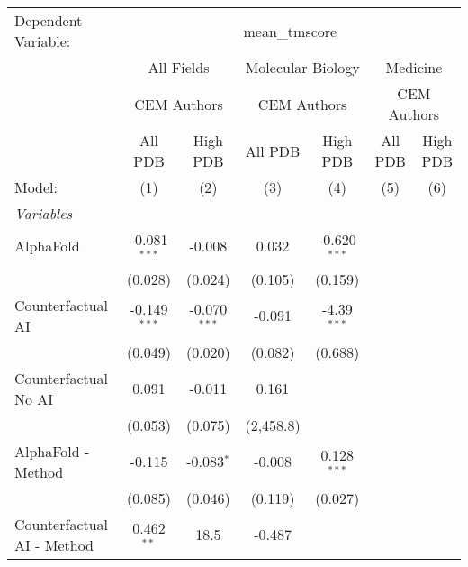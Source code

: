 \begingroup
\centering
\begin{tabular}{lcccccc}
   \tabularnewline \midrule \midrule
   Dependent Variable: & \multicolumn{6}{c}{mean\_tmscore}\\
 & \multicolumn{2}{c}{All Fields} & \multicolumn{2}{c}{Molecular Biology} & \multicolumn{2}{c}{Medicine} \\
\cmidrule(lr){2-3} \cmidrule(lr){4-5} \cmidrule(lr){6-7}
 & \multicolumn{2}{c}{CEM Authors} & \multicolumn{2}{c}{CEM Authors} & \multicolumn{2}{c}{CEM Authors} \\
\cmidrule(lr){2-3} \cmidrule(lr){4-5} \cmidrule(lr){6-7}
 & \multicolumn{1}{c}{All PDB} & \multicolumn{1}{c}{High PDB} & \multicolumn{1}{c}{All PDB} & \multicolumn{1}{c}{High PDB} & \multicolumn{1}{c}{All PDB} & \multicolumn{1}{c}{High PDB} \\
\cmidrule(lr){2-2} \cmidrule(lr){3-3} \cmidrule(lr){4-4} \cmidrule(lr){5-5} \cmidrule(lr){6-6} \cmidrule(lr){7-7}
   Model:                                   & (1)            & (2)            & (3)        & (4)            & (5) & (6)\\  
   \midrule
   \emph{Variables}\\
   AlphaFold                                & -0.081$^{***}$ & -0.008         & 0.032      & -0.620$^{***}$ &     &   \\   
                                            & (0.028)        & (0.024)        & (0.105)    & (0.159)        &     &   \\   
   Counterfactual AI                        & -0.149$^{***}$ & -0.070$^{***}$ & -0.091     & -4.39$^{***}$  &     &   \\   
                                            & (0.049)        & (0.020)        & (0.082)    & (0.688)        &     &   \\   
   Counterfactual No AI                     & 0.091          & -0.011         & 0.161      &                &     &   \\   
                                            & (0.053)        & (0.075)        & (2,458.8)  &                &     &   \\   
   AlphaFold - Method                       & -0.115         & -0.083$^{*}$   & -0.008     & 0.128$^{***}$  &     &   \\   
                                            & (0.085)        & (0.046)        & (0.119)    & (0.027)        &     &   \\   
   Counterfactual AI - Method               & 0.462$^{**}$   & 18.5           & -0.487     &                &     &   \\   

\end{tabular}
